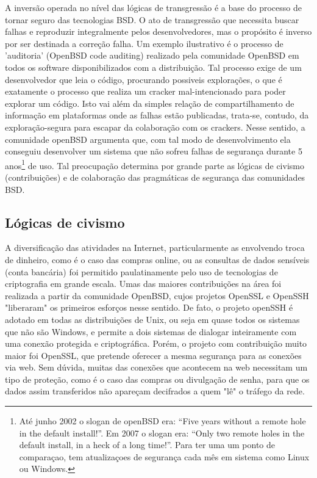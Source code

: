 A inversão operada no nível das lógicas de transgressão é a base do processo de tornar seguro das tecnologias BSD. O ato de transgressão que necessita buscar falhas e reproduzir integralmente pelos desenvolvedores, mas o propósito é inverso por ser destinada a correção falha. Um exemplo ilustrativo é o processo de 'auditoria' (OpenBSD code auditing) realizado pela comunidade OpenBSD em todos os software disponibilizados com a distribuição. Tal processo exige de um desenvolvedor que leia o código, procurando possiveis explorações, o que é exatamente o processo que realiza um cracker mal-intencionado para poder explorar um código. Isto vai além da simples relação de compartilhamento de informação em plataformas onde as falhas estão publicadas, trata-se, contudo, da exploração-segura para escapar da colaboração com os crackers. Nesse sentido, a comunidade openBSD argumenta que, com tal modo de desenvolvimento ela conseguiu desenvolver um sistema que não sofreu falhas de segurança durante 5 anos\footnote{Até junho 2002 o slogan de openBSD era: “Five years without a remote hole in the default install!”. Em 2007 o slogan era: “Only two remote holes in the default install, in a heck of a long time!”. Para ter uma um ponto de comparaçao, tem atualizaçoes de segurança cada mês em sistema como Linux ou Windows.} de uso. Tal preocupação determina por grande parte as lógicas de civismo (contribuições) e de colaboração das pragmáticas de segurança das comunidades BSD.

\subsection{Lógicas de civismo} \label{3.4.2}

A diversificação das atividades na Internet, particularmente as envolvendo troca de dinheiro, como é o caso das compras online, ou as consultas de dados sensíveis (conta bancária) foi permitido paulatinamente pelo uso de tecnologias de criptografia em grande escala. Umas das maiores contribuições na área foi realizada a partir da comunidade OpenBSD, cujos projetos OpenSSL e OpenSSH "liberaram" os primeiros esforços nesse sentido. De fato, o projeto openSSH é adotado em todas as distribuições de Unix, ou seja em quase todos os sistemas que não são Windows, e permite a dois sistemas de dialogar inteiramente com uma conexão protegida e criptográfica. Porém, o projeto com contribuição muito maior foi OpenSSL,  que pretende oferecer a mesma segurança para as conexões via  web. Sem dúvida, muitas das conexões que acontecem na web necessitam um tipo de proteção, como é o caso das compras ou divulgação de senha, para que os dados assim transferidos não apareçam decifrados a quem "lê" o tráfego da rede.

